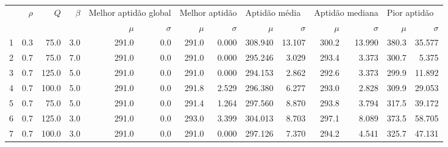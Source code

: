 \begin{tabular}{lrrrrrrrrrrrrr}
\toprule
 & $\rho$ & $Q$   & $\beta$ & \multicolumn{2}{p{2.0cm}}{Melhor aptidão global} & \multicolumn{2}{l}{Melhor aptidão} & \multicolumn{2}{l}{Aptidão média} & \multicolumn{2}{l}{Aptidão mediana} & \multicolumn{2}{l}{Pior aptidão}                         \\
 &        &       &         & $\mu$                                            & $\sigma$                           & $\mu$                             & $\sigma$                            & $\mu$   & $\sigma$ & $\mu$ & $\sigma$ & $\mu$ & $\sigma$ \\
\midrule
1  & 0.3    & 75.0  & 3.0     & 291.0                                            & 0.0                                & 291.0                             & 0.000                               & 308.940 & 13.107   & 300.2 & 13.990   & 380.3 & 35.577   \\
2  & 0.7    & 75.0  & 7.0     & 291.0                                            & 0.0                                & 291.0                             & 0.000                               & 295.246 & 3.029    & 293.4 & 3.373    & 300.7 & 5.375    \\
3  & 0.7    & 125.0 & 5.0     & 291.0                                            & 0.0                                & 291.0                             & 0.000                               & 294.153 & 2.862    & 292.6 & 3.373    & 299.9 & 11.892   \\
4  & 0.7    & 100.0 & 5.0     & 291.0                                            & 0.0                                & 291.8                             & 2.529                               & 296.380 & 6.277    & 293.0 & 2.828    & 309.9 & 29.053   \\
5  & 0.7    & 75.0  & 5.0     & 291.0                                            & 0.0                                & 291.4                             & 1.264                               & 297.560 & 8.870    & 293.8 & 3.794    & 317.5 & 39.172   \\
6  & 0.7    & 125.0 & 3.0     & 291.0                                            & 0.0                                & 293.0                             & 3.399                               & 304.013 & 8.703    & 297.1 & 8.089    & 373.5 & 58.705   \\
7  & 0.7    & 100.0 & 3.0     & 291.0                                            & 0.0                                & 291.0                             & 0.000                               & 297.126 & 7.370    & 294.2 & 4.541    & 325.7 & 47.131   \\

\end{tabular}
